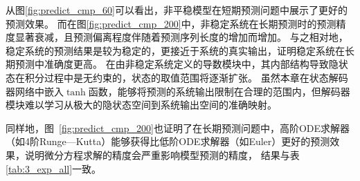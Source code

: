从图\ref{fig:predict_cmp_60}可以看出，非平稳模型在短期预测问题中展示了更好的预测效果。
而在图\ref{fig:predict_cmp_200}中，非稳定系统在长期预测时的预测精度显著衰减，且预测偏离程度伴随着预测序列长度的增加而增加。
与之相对地，稳定系统的预测结果是较为稳定的，更接近于系统的真实输出，证明稳定系统在长期预测中准确度更高。
在由非稳定系统定义的导数模块中，其内部结构导致隐状态在积分过程中是无约束的，状态的取值范围将逐渐扩张。
虽然本章在状态解码器网络中嵌入$\tanh$函数，能够将预测的系统输出限制在合理的范围内，但解码器模块难以学习从极大的隐状态空间到系统输出空间的准确映射。

同样地，图~\ref{fig:predict_cmp_200}也证明了在长期预测问题中，高阶ODE求解器（如4阶Runge—Kutta）能够获得比低阶ODE求解器（如Euler）更好的预测效果，说明微分方程求解的精度会严重影响模型预测的精度，
结果与表\ref{tab:3_exp_all}一致。











